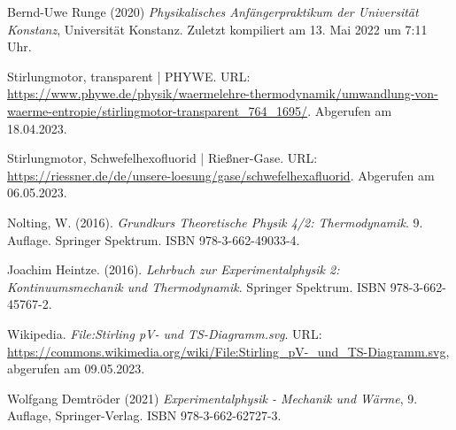 \documentclass[../main.tex]{subfiles}
\begin{document}
	\begin{thebibliography}{9}
		 Bernd-Uwe Runge (2020) \emph{Physikalisches Anfängerpraktikum der Universität Konstanz}, Universität Konstanz. Zuletzt kompiliert am 13. Mai 2022 um 7:11 Uhr.

         Stirlungmotor, transparent | PHYWE. URL: \url{https://www.phywe.de/physik/waermelehre-thermodynamik/umwandlung-von-waerme-entropie/stirlingmotor-transparent_764_1695/}. Abgerufen am 18.04.2023. 

         Stirlungmotor, Schwefelhexofluorid | Rießner-Gase. URL: \url{https://riessner.de/de/unsere-loesung/gase/schwefelhexafluorid}. Abgerufen am 06.05.2023. 

		 Nolting, W. (2016). \emph{Grundkurs Theoretische Physik 4/2: Thermodynamik}. 9. Auflage. Springer Spektrum. ISBN 978-3-662-49033-4.
		
		 Joachim Heintze. (2016). \emph{Lehrbuch zur Experimentalphysik 2: Kontinuumsmechanik und Thermodynamik}. Springer Spektrum. ISBN 978-3-662-45767-2.

		 Wikipedia. \emph{File:Stirling pV- und TS-Diagramm.svg}. URL: \url{https://commons.wikimedia.org/wiki/File:Stirling_pV-_und_TS-Diagramm.svg}, abgerufen am 09.05.2023.
  
		
         Wolfgang Demtröder (2021) \emph{Experimentalphysik - Mechanik und Wärme}, 9. Auflage, Springer-Verlag. ISBN 978-3-662-62727-3.
  
		
		
		

\end{thebibliography}
\end{document}
